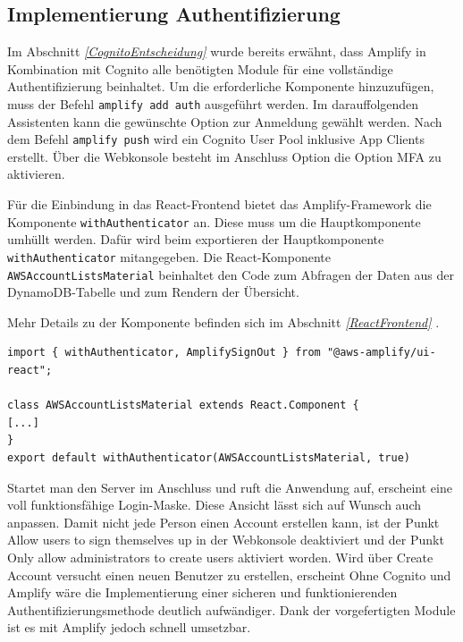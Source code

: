 \subsection{Implementierung Authentifizierung}
\label{ImpAuth}
Im Abschnitt \textit{\ref{CognitoEntscheidung} } wurde bereits erwähnt, dass Amplify in Kombination mit Cognito
alle benötigten Module für eine vollständige Authentifizierung beinhaltet.
Um die erforderliche Komponente hinzuzufügen, muss der Befehl \verb+amplify add auth+ ausgeführt werden.
Im darauffolgenden Assistenten kann die gewünschte Option zur Anmeldung gewählt werden.
Nach dem Befehl \verb+amplify push+ wird ein Cognito User Pool inklusive App Clients erstellt.
Über die Webkonsole besteht im Anschluss Option die Option MFA zu aktivieren.

Für die Einbindung in das React-Frontend bietet das Amplify-Framework die Komponente \verb+withAuthenticator+ an.
Diese muss um die Hauptkomponente umhüllt werden.
Dafür wird beim exportieren der Hauptkomponente \verb+withAuthenticator+ mitangegeben. \cite[]{ImpAuth}
Die React-Komponente \verb+AWSAccountListsMaterial+ beinhaltet den Code zum Abfragen der Daten aus der DynamoDB-Tabelle und zum Rendern der Übersicht.

Mehr Details zu der Komponente befinden sich im Abschnitt \textit{\ref{ReactFrontend} }.
\\
\begin{lstlisting}[basicstyle=\ttfamily\small, breaklines=true , frame = single, backgroundcolor=\color{flashwhite},caption={Auszug aus React-Frontend (Datei: \textit{\nameref{lst:React AccountList}} )} ]
import { withAuthenticator, AmplifySignOut } from "@aws-amplify/ui-react";

class AWSAccountListsMaterial extends React.Component {
[...]
}
export default withAuthenticator(AWSAccountListsMaterial, true)
    \end{lstlisting}



Startet man den Server im Anschluss und ruft die Anwendung auf, erscheint eine voll funktionsfähige Login-Maske.
Diese Ansicht lässt sich auf Wunsch auch anpassen.
Damit nicht jede Person einen Account erstellen kann, ist der Punkt \glqq Allow users to sign themselves up\grqq{} in der Webkonsole deaktiviert und der Punkt \glqq Only allow administrators to create users\grqq{} aktiviert worden.
Wird über \glqq Create Account\grqq{} versucht einen neuen Benutzer zu erstellen, erscheint
Ohne Cognito und Amplify wäre die Implementierung einer sicheren und funktionierenden Authentifizierungsmethode deutlich aufwändiger.
Dank der vorgefertigten Module ist es mit Amplify jedoch schnell umsetzbar.

